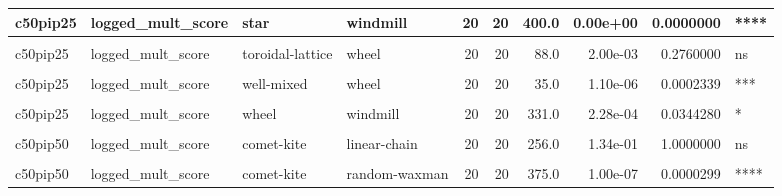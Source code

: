 \documentclass[
]{book}
\begin{document}
\begin{table}
\begin{tabular}{l|l|l|l|r|r|r|r|r|l}
\hline
c50pip25 & logged\_mult\_score & star & windmill & 20 & 20 & 400.0 & 0.00e+00 & 0.0000000 & ****\\
\hline
\cellcolor{gray!6}{c50pip25} & \cellcolor{gray!6}{logged\_mult\_score} & \cellcolor{gray!6}{toroidal-lattice} & \cellcolor{gray!6}{well-mixed} & \cellcolor{gray!6}{20} & \cellcolor{gray!6}{20} & \cellcolor{gray!6}{301.0} & \cellcolor{gray!6}{6.00e-03} & \cellcolor{gray!6}{0.7380000} & \cellcolor{gray!6}{ns}\\
\hline
c50pip25 & logged\_mult\_score & toroidal-lattice & wheel & 20 & 20 & 88.0 & 2.00e-03 & 0.2760000 & ns\\
\hline
\cellcolor{gray!6}{c50pip25} & \cellcolor{gray!6}{logged\_mult\_score} & \cellcolor{gray!6}{toroidal-lattice} & \cellcolor{gray!6}{windmill} & \cellcolor{gray!6}{20} & \cellcolor{gray!6}{20} & \cellcolor{gray!6}{241.0} & \cellcolor{gray!6}{2.77e-01} & \cellcolor{gray!6}{1.0000000} & \cellcolor{gray!6}{ns}\\
\hline
c50pip25 & logged\_mult\_score & well-mixed & wheel & 20 & 20 & 35.0 & 1.10e-06 & 0.0002339 & ***\\
\hline
\cellcolor{gray!6}{c50pip25} & \cellcolor{gray!6}{logged\_mult\_score} & \cellcolor{gray!6}{well-mixed} & \cellcolor{gray!6}{windmill} & \cellcolor{gray!6}{20} & \cellcolor{gray!6}{20} & \cellcolor{gray!6}{129.0} & \cellcolor{gray!6}{5.60e-02} & \cellcolor{gray!6}{1.0000000} & \cellcolor{gray!6}{ns}\\
\hline
c50pip25 & logged\_mult\_score & wheel & windmill & 20 & 20 & 331.0 & 2.28e-04 & 0.0344280 & *\\
\hline
\cellcolor{gray!6}{c50pip50} & \cellcolor{gray!6}{logged\_mult\_score} & \cellcolor{gray!6}{comet-kite} & \cellcolor{gray!6}{cycle} & \cellcolor{gray!6}{20} & \cellcolor{gray!6}{20} & \cellcolor{gray!6}{232.0} & \cellcolor{gray!6}{3.98e-01} & \cellcolor{gray!6}{1.0000000} & \cellcolor{gray!6}{ns}\\
\hline
c50pip50 & logged\_mult\_score & comet-kite & linear-chain & 20 & 20 & 256.0 & 1.34e-01 & 1.0000000 & ns\\
\hline
\cellcolor{gray!6}{c50pip50} & \cellcolor{gray!6}{logged\_mult\_score} & \cellcolor{gray!6}{comet-kite} & \cellcolor{gray!6}{random-barabasi-albert} & \cellcolor{gray!6}{20} & \cellcolor{gray!6}{20} & \cellcolor{gray!6}{400.0} & \cellcolor{gray!6}{0.00e+00} & \cellcolor{gray!6}{0.0000000} & \cellcolor{gray!6}{****}\\
\hline
c50pip50 & logged\_mult\_score & comet-kite & random-waxman & 20 & 20 & 375.0 & 1.00e-07 & 0.0000299 & ****\\

\end{tabular}
\end{table}
\end{document}
